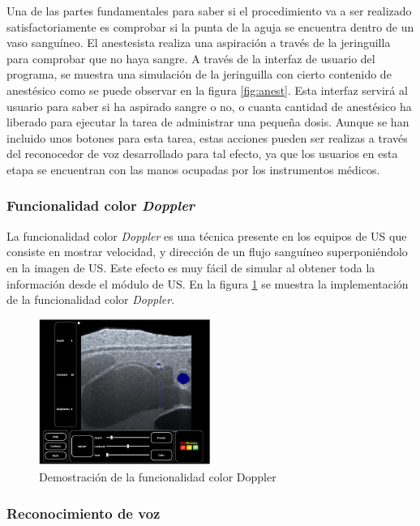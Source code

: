 Una de las partes fundamentales para saber si el procedimiento va a ser realizado satisfactoriamente es comprobar si la punta de la aguja se encuentra dentro de un vaso sanguíneo. El anestesista realiza una aspiración a través de la jeringuilla para comprobar que no haya sangre. A través de la interfaz de usuario del programa, se muestra una simulación de la jeringuilla con cierto contenido de anestésico como se puede observar en la figura \ref{fig:anest}. Esta interfaz servirá al usuario para saber si ha aspirado sangre o no, o cuanta cantidad de anestésico ha liberado para ejecutar la tarea de administrar una pequeña dosis. Aunque se han incluido unos botones para esta tarea, estas acciones pueden ser realizas a través del reconocedor de voz desarrollado para tal efecto, ya que los usuarios en esta etapa se encuentran con las manos ocupadas por los instrumentos médicos.




\subsubsection{Funcionalidad color \emph{Doppler}}
\label{doppler}
La funcionalidad color \emph{Doppler} es una técnica presente en los equipos de \ac{US} que consiste en mostrar velocidad, y dirección de un flujo sanguíneo superponiéndolo en la imagen de \ac{US}. Este efecto es muy fácil de simular al obtener toda la información desde el módulo de \ac{US}.
En la figura \ref{fig:doppler} se muestra la implementación de la funcionalidad color \emph{Doppler}.

\begin{figure}[h]
    \centering
    \includegraphics[width=0.5\textwidth]{IMG/uscolor.PNG}
    \caption{Demostración de la funcionalidad color Doppler}
    \label{fig:doppler}
\end{figure}


 
 
\subsubsection{Reconocimiento de voz}

